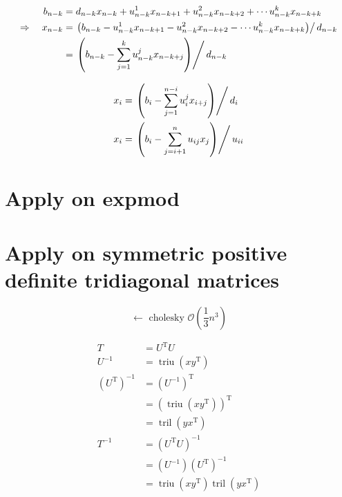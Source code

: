 \documentclass[11pt]{article}
\newcommand{\triu}{\mathop{\mathrm{triu}}}
\newcommand{\tril}{\mathop{\mathrm{tril}}}
\newcommand{\T}{\mathrm{T}}
\begin{document}
\begin{align}
    b_{n-k} &= d_{n-k} x_{n-k}+u_{n-k}^{1} x_{n-k+1}+u_{n-k}^{2} x_{n-k+2} + \cdots u_{n-k}^{k} x_{n-k+k}\\
    \Rightarrow \quad x_{n-k} &= \left.\left(b_{n-k}-u_{n-k}^{1} x_{n-k+1}-u_{n-k}^{2} x_{n-k+2} - \cdots
        u_{n-k}^{k} x_{n-k+k}\right) \right/ d_{n-k}\\
        &= \left.\left(b_{n-k}-\sum_{j=1}^{k} u_{n-k}^{j} x_{n-k+j}\right) \right/ d_{n-k} \\
\end{align}


\begin{align}
    x_{i} &= \left.\left(b_{i}-\sum_{j=1}^{n-i} u_{i}^{j} x_{i+j}\right) \right/ d_{i} \\
    x_{i} &= \left.\left(b_{i}-\sum_{j=i+1}^{n} u_{i j} x_{j}\right) \right/ u_{i i}
\end{align}



\newpage

\section{Apply on expmod}




\newpage

\section{Apply on symmetric positive definite tridiagonal matrices}
$$\longleftarrow \text { cholesky } \mathcal{O}\left(\frac{1}{3} n^{3}\right)$$

\begin{align*}
    T &= U^{\T} U \\
    U^{-1} &= \triu\left(x y^{\T}\right) \\
    \left(U^{\T}\right)^{-1} &= \left(U^{-1}\right)^{\T} \\
        &=\left(\triu \left(x y^{\T}\right)\right)^{\T} \\
        &= \tril\left(y x^{\T}\right) \\
    T^{-1} &= \left(U^{\T} U\right)^{-1} \\
        &= \left(U^{-1}\right)\left(U^{\T}\right)^{-1} \\
        &= \triu \left(x y^{\T}\right) \tril \left(y x^{\T}\right) 
\end{align*}
\end{document}
